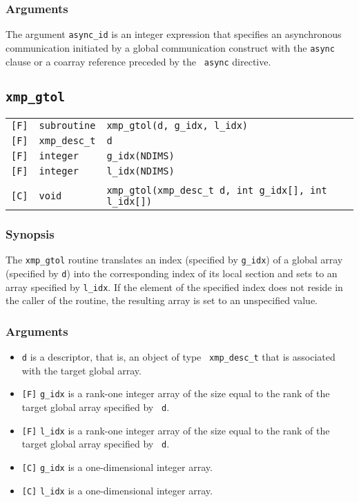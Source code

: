 \subsubsection*{Arguments}

The argument {\tt async\_id} is an integer expression that specifies an
asynchronous communication initiated by a global communication construct
with the {\tt async} clause or a coarray reference preceded by the {\tt
async} directive.

\vspace{0.3cm}

\subsection{\tt xmp\_gtol}

\begin{tabular}{lll}

\verb![F]!& {\tt subroutine} & {\tt xmp\_gtol(d, g\_idx, l\_idx)} \\
\verb![F]!& {\tt xmp\_desc\_t} & {\tt d}\\
\verb![F]!& {\tt integer} & {\tt g\_idx(NDIMS)}\\
\verb![F]!& {\tt integer} & {\tt l\_idx(NDIMS)}\\
          & & \\
\verb![C]!&  {\tt void} & {\tt xmp\_gtol(xmp\_desc\_t d, int g\_idx[], int l\_idx[])}

\end{tabular}

\subsubsection*{Synopsis}

The {\tt xmp\_gtol} routine translates an index (specified by
{\tt g\_idx}) of a global array (specified by {\tt d}) into the
corresponding index of its local section and sets to an array specified
by {\tt l\_idx}. If the element of the specified index does not reside
in the caller of the routine, the resulting array is set to an
unspecified value.

\subsubsection*{Arguments}

\begin{itemize}
 \item {\tt d} is a descriptor, that is, an object of type {\tt
       xmp\_desc\_t} that is associated with the target global array.
 \item \verb![F]! {\tt g\_idx} is a rank-one integer array of the size
       equal to the rank of the target global array specified by {\tt
       d}.
 \item \verb![F]! {\tt l\_idx} is a rank-one integer array of the size
       equal to the rank of the target global array specified by {\tt
       d}.
 \item \verb![C]! {\tt g\_idx} is a one-dimensional integer array.
 \item \verb![C]! {\tt l\_idx} is a one-dimensional integer array.
\end{itemize}


